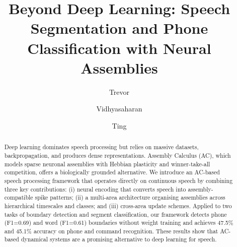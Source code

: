 \documentclass[cameraready]{Interspeech}
\title{Beyond Deep Learning: Speech Segmentation and Phone Classification with Neural Assemblies}
\author[affiliation={}, orcid=0009-0002-5763-3311]{Trevor}{Adelson}
\author[affiliation={2}, orcid=0000-0001-8492-1787]{Vidhyasaharan}{Sethu}
\author[affiliation={1}, orcid=0000-0003-3806-1493]{Ting}{Dang}
\begin{document}
\maketitle

\begin{abstract}
Deep learning dominates speech processing but relies on massive datasets, backpropagation, and produces dense representations. Assembly Calculus (AC), which models sparse neuronal assemblies with Hebbian plasticity and winner-take-all competition, offers a biologically grounded alternative. We introduce an AC-based speech processing framework that operates directly on continuous speech by combining three key contributions: (i) neural encoding that converts speech into assembly-compatible spike patterns; (ii) a multi-area architecture organising assemblies across hierarchical timescales and classes; and (iii) cross-area update schemes. Applied to two tasks of boundary detection and segment classification, our framework detects phone (F1=0.69) and word (F1=0.61) boundaries without weight training and achieves 47.5\% and 45.1\% accuracy on phone and command recognition. These results show that AC-based dynamical systems are a promising alternative to deep learning for speech.
\end{abstract}














\end{document}
